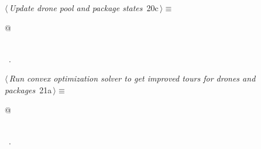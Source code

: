 \documentclass[10pt, english, oneside]{report}
\begin{document}
\begin{flushleft} \small
\begin{minipage}{\linewidth}\label{scrap19}\raggedright\small
{} $\langle\,${\itshape Update drone pool and package states}\nobreak\ {\footnotesize {20c}}$\,\rangle\equiv$
\vspace{-1ex}
\begin{list}{}{} \item
\mbox{}\verb@   @\\
\mbox{}\verb@pass@\\
\mbox{}\verb@@{\NWsep}
\end{list}
\vspace{-1.5ex}
\footnotesize
\begin{list}{}{\setlength{\itemsep}{-\parsep}\setlength{\itemindent}{-\leftmargin}}
\item \NWtxtMacroRefIn\ .

\item{}
\end{list}
\end{minipage}\vspace{4ex}
\end{flushleft}


\begin{flushleft} \small
\begin{minipage}{\linewidth}\label{scrap20}\raggedright\small
{} $\langle\,${\itshape Run convex optimization solver to get improved tours for drones and packages}\nobreak\ {\footnotesize {21a}}$\,\rangle\equiv$
\vspace{-1ex}
\begin{list}{}{} \item
\mbox{}\verb@   @\\
\mbox{}\verb@pass@\\
\mbox{}\verb@@{\NWsep}
\end{list}
\vspace{-1.5ex}
\footnotesize
\begin{list}{}{\setlength{\itemsep}{-\parsep}\setlength{\itemindent}{-\leftmargin}}
\item \NWtxtMacroRefIn\ .

\item{}
\end{list}
\end{minipage}\vspace{4ex}
\end{flushleft}
\end{document}
